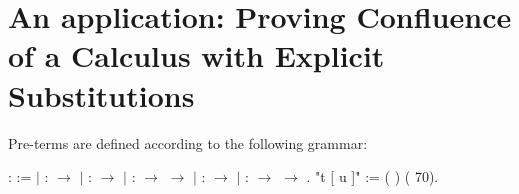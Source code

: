 \section{An application: Proving Confluence of a Calculus with Explicit Substitutions}

\begin{coqdoccode}
\coqdocemptyline
\coqdocemptyline
\end{coqdoccode}
Pre-terms are defined according to the following grammar: \begin{coqdoccode}
\coqdocnoindent
{}  :  :=\coqdoceol
\coqdocindent{1.00em}
\ensuremath{|}  :  \ensuremath{\rightarrow} \coqdoceol
\coqdocindent{1.00em}
\ensuremath{|}  :  \ensuremath{\rightarrow} \coqdoceol
\coqdocindent{1.00em}
\ensuremath{|}   :  \ensuremath{\rightarrow}  \ensuremath{\rightarrow} \coqdoceol
\coqdocindent{1.00em}
\ensuremath{|}   :  \ensuremath{\rightarrow} \coqdoceol
\coqdocindent{1.00em}
\ensuremath{|}  :  \ensuremath{\rightarrow}  \ensuremath{\rightarrow} .\coqdoceol
\coqdocemptyline
\coqdocnoindent
{} "t [ u ]" := (  ) (  70).\coqdoceol
\end{coqdoccode}
